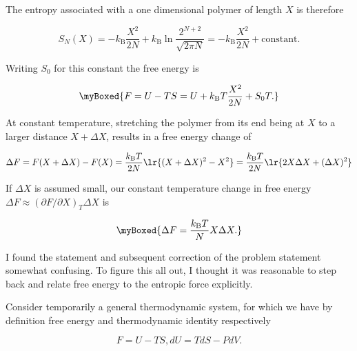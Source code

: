 {The entropy associated with a one dimensional polymer of length $X$ is therefore

\begin{equation}\label{eqn:basicStatMechProblemSet5Problem1:100}
S_N(X) 
= 
- k_{\mathrm{B}} \frac{X^2}{2N} + k_{\mathrm{B}} \ln \frac{2^{N + 2}}{\sqrt{2 \pi N}} 
= 
- k_{\mathrm{B}} \frac{X^2}{2N} + \text{constant}.
\end{equation}

Writing $S_0$ for this constant the free energy is

\begin{equation}\label{eqn:basicStatMechProblemSet5Problem1:120}
\myBoxed{
F = U - T S = U + k_{\mathrm{B}} T \frac{X^2}{2N} + S_0 T.
}
\end{equation}


At constant temperature, stretching the polymer from its end being at $X$ to a larger distance $X + \Delta X$, results in a free energy change of

\begin{dmath}\label{eqn:basicStatMechProblemSet5Problem1:260}
\Delta F 
= F( X + \Delta X ) - F(X)
=
 \frac{k_{\mathrm{B}} T}{2N} \lr{(X + \Delta X)^2 - X^2}
=
 \frac{k_{\mathrm{B}} T}{2N} \lr{ 2 X \Delta X + (\Delta X)^2 }
\end{dmath}

If $\Delta X$ is assumed small, our constant temperature change in free energy $\Delta F \approx (\partial F/\partial X)_T \Delta X$ is

\begin{equation}\label{eqn:basicStatMechProblemSet5Problem1:280}
\myBoxed{
\Delta F =
 \frac{k_{\mathrm{B}} T}{N} X \Delta X.
}
\end{equation}


I found the statement and subsequent correction of the problem statement somewhat confusing.  To figure this all out, I thought it was reasonable to step back and relate free energy to the entropic force explicitly.

Consider temporarily a general thermodynamic system, for which we have by definition free energy and thermodynamic identity respectively

\begin{subequations}
\begin{equation}\label{eqn:basicStatMechProblemSet5Problem1:140}
F = U - T S,
\end{equation}
\begin{equation}\label{eqn:basicStatMechProblemSet5Problem1:160}
dU = T dS - P dV.
\end{equation}
\end{subequations}

}
